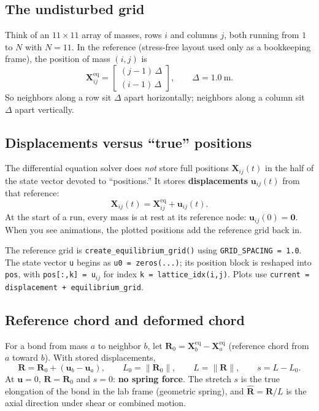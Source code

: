 \documentclass[11pt,a4paper]{article}
\begin{document}
\subsection{The undisturbed grid}
Think of an $11\times 11$ array of masses, rows $i$ and columns $j$, both running from $1$ to $N$ with $N=11$. In the reference (stress-free layout used only as a bookkeeping frame), the position of mass $(i,j)$ is
\begin{equation}
\mathbf{X}_{ij}^{\mathrm{eq}} =
\begin{bmatrix} (j-1)\,\Delta \\ (i-1)\,\Delta \end{bmatrix},
\qquad \Delta = 1.0\ \mathrm{m}.
\end{equation}
So neighbors along a row sit $\Delta$ apart horizontally; neighbors along a column sit $\Delta$ apart vertically.

\subsection{Displacements versus ``true'' positions}
The differential equation solver does \emph{not} store full positions $\mathbf{X}_{ij}(t)$ in the half of the state vector devoted to ``positions.'' It stores \textbf{displacements} $\mathbf{u}_{ij}(t)$ from that reference:
\begin{equation}
\mathbf{X}_{ij}(t) = \mathbf{X}_{ij}^{\mathrm{eq}} + \mathbf{u}_{ij}(t).
\end{equation}
At the start of a run, every mass is at rest at its reference node: $\mathbf{u}_{ij}(0)=\mathbf{0}$. When you see animations, the plotted positions add the reference grid back in.

\begin{codebox}
The reference grid is \texttt{create\_equilibrium\_grid()} using \texttt{GRID\_SPACING = 1.0}. The state vector \texttt{u} begins as \texttt{u0 = zeros(...)}; its position block is reshaped into \texttt{pos}, with \texttt{pos[:,k] = u}$_{ij}$ for index \texttt{k = lattice\_idx(i,j)}. Plots use \texttt{current = displacement + equilibrium\_grid}.
\end{codebox}

\subsection{Reference chord and deformed chord}
For a bond from mass $a$ to neighbor $b$, let $\mathbf{R}_0=\mathbf{X}_b^{\mathrm{eq}}-\mathbf{X}_a^{\mathrm{eq}}$ (reference chord from $a$ toward $b$). With stored displacements,
\begin{equation}
\mathbf{R}=\mathbf{R}_0+(\mathbf{u}_b-\mathbf{u}_a),\qquad
L_0=\|\mathbf{R}_0\|,\qquad L=\|\mathbf{R}\|,\qquad s=L-L_0.
\label{eq:rdef}
\end{equation}
At $\mathbf{u}=0$, $\mathbf{R}=\mathbf{R}_0$ and $s=0$: \textbf{no spring force}. The stretch $s$ is the true elongation of the bond in the lab frame (geometric spring), and $\hat{\mathbf{R}}=\mathbf{R}/L$ is the axial direction under shear or combined motion.
\end{document}

